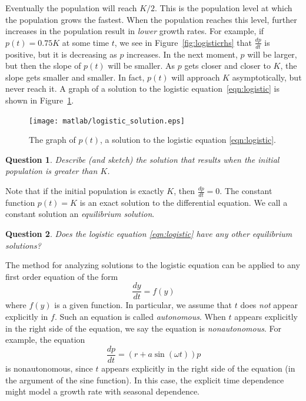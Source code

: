 \documentclass{book}
\newtheorem{question}{Question}
\begin{document}
Eventually the population will reach $K/2$.  This is the population
level at which the population grows the fastest.
When the population reaches this level, further increases in the
population result in \emph{lower} growth rates.
For example, if $p(t) = 0.75K$ at some time $t$, we see in
Figure~\ref{fig:logisticrhs} that $\frac{dp}{dt}$ is positive, but it is
decreasing as $p$ increases.  In the next moment, $p$ will be larger,
but then the slope of $p(t)$ will be smaller.
As $p$ gets closer and closer to $K$, the slope gets smaller and smaller.
In fact, $p(t)$ will approach $K$ asymptotically, but never reach it.
A graph of a solution to the logistic equation~\eqref{eqn:logistic} is
shown in Figure~\ref{fig:logisticsol}.
\begin{figure}
\centerline{\texttt{[image: matlab/logistic\_solution.eps]}} 
\caption{The graph of $p(t)$, a solution to the logistic
equation \eqref{eqn:logistic}.}
\label{fig:logisticsol}
\end{figure}

\begin{question}
Describe (and sketch) the solution that
results when the initial population is greater than $K$.
\end{question}

Note that if the initial population is exactly $K$, then
$\frac{dp}{dt} = 0$.  The constant function $p(t)=K$ is an
exact solution to the differential equation.
We call a constant solution an
\emph{equilibrium solution}.

\begin{question}
Does the logistic equation \eqref{eqn:logistic} have any other
equilibrium solutions?
\end{question}

The method for analyzing solutions to the logistic equation can be
applied to any first order equation of the form
\begin{equation}
   \frac{dy}{dt} = f(y)
\end{equation}
where $f(y)$ is a given function.
In particular, we assume that $t$ does \emph{not} appear explicitly
in $f$.  Such an equation is called \emph{autonomous}.
When $t$ appears explicitly in the right side of the equation,
we say the equation is \emph{nonautonomous}.
For example, the equation
\begin{equation}
  \frac{dp}{dt} = (r+a \sin(\omega t))p
\end{equation}
is nonautonomous, since $t$ appears explicitly in the right side of the
equation (in the argument of the sine function).
In this case, the explicit time dependence might model a growth
rate with seasonal dependence.
\end{document}
